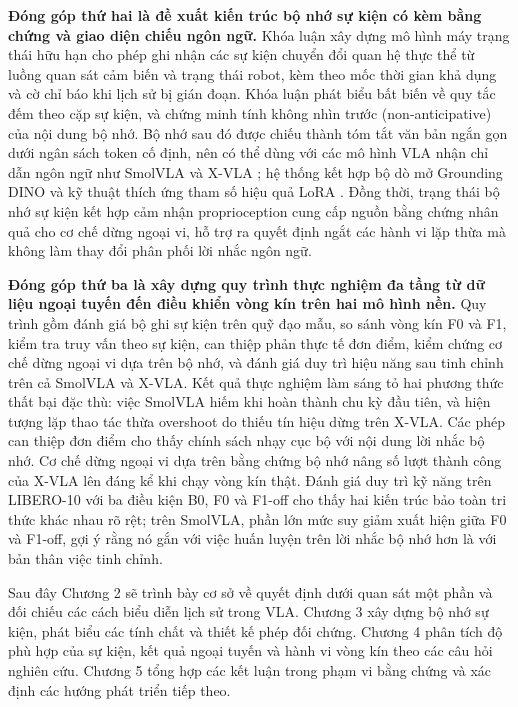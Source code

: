 \textbf{Đóng góp thứ hai là đề xuất kiến trúc bộ nhớ sự kiện có kèm bằng chứng và giao diện chiếu ngôn ngữ.} Khóa luận xây dựng mô hình máy trạng thái hữu hạn cho phép ghi nhận các sự kiện chuyển đổi quan hệ thực thể từ luồng quan sát cảm biến và trạng thái robot, kèm theo mốc thời gian khả dụng và cờ chỉ báo khi lịch sử bị gián đoạn. Khóa luận phát biểu bất biến về quy tắc đếm theo cặp sự kiện, và chứng minh tính không nhìn trước (non-anticipative) của nội dung bộ nhớ. Bộ nhớ sau đó được chiếu thành tóm tắt văn bản ngắn gọn dưới ngân sách token cố định, nên có thể dùng với các mô hình VLA nhận chỉ dẫn ngôn ngữ như SmolVLA \cite{smolvla2025} và X-VLA \cite{xvla2025}; hệ thống kết hợp bộ dò mở Grounding DINO \cite{groundingdino2024} và kỹ thuật thích ứng tham số hiệu quả LoRA \cite{lora2021}. Đồng thời, trạng thái bộ nhớ sự kiện kết hợp cảm nhận proprioception cung cấp nguồn bằng chứng nhân quả cho cơ chế dừng ngoại vi, hỗ trợ ra quyết định ngắt các hành vi lặp thừa mà không làm thay đổi phân phối lời nhắc ngôn ngữ.

\textbf{Đóng góp thứ ba là xây dựng quy trình thực nghiệm đa tầng từ dữ liệu ngoại tuyến đến điều khiển vòng kín trên hai mô hình nền.} Quy trình gồm đánh giá bộ ghi sự kiện trên quỹ đạo mẫu, so sánh vòng kín F0 và F1, kiểm tra truy vấn theo sự kiện, can thiệp phản thực tế đơn điểm, kiểm chứng cơ chế dừng ngoại vi dựa trên bộ nhớ, và đánh giá duy trì hiệu năng sau tinh chỉnh trên cả SmolVLA và X-VLA. Kết quả thực nghiệm làm sáng tỏ hai phương thức thất bại đặc thù: việc SmolVLA hiếm khi hoàn thành chu kỳ đầu tiên, và hiện tượng lặp thao tác thừa overshoot do thiếu tín hiệu dừng trên X-VLA. Các phép can thiệp đơn điểm cho thấy chính sách nhạy cục bộ với nội dung lời nhắc bộ nhớ. Cơ chế dừng ngoại vi dựa trên bằng chứng bộ nhớ nâng số lượt thành công của X-VLA lên đáng kể khi chạy vòng kín thật. Đánh giá duy trì kỹ năng trên LIBERO-10 với ba điều kiện B0, F0 và F1-off cho thấy hai kiến trúc bảo toàn tri thức khác nhau rõ rệt; trên SmolVLA, phần lớn mức suy giảm xuất hiện giữa F0 và F1-off, gợi ý rằng nó gắn với việc huấn luyện trên lời nhắc bộ nhớ hơn là với bản thân việc tinh chỉnh.

Sau đây Chương 2 sẽ trình bày cơ sở về quyết định dưới quan sát một phần và đối chiếu các cách biểu diễn lịch sử trong VLA. Chương 3 xây dựng bộ nhớ sự kiện, phát biểu các tính chất và thiết kế phép đối chứng. Chương 4 phân tích độ phù hợp của sự kiện, kết quả ngoại tuyến và hành vi vòng kín theo các câu hỏi nghiên cứu. Chương 5 tổng hợp các kết luận trong phạm vi bằng chứng và xác định các hướng phát triển tiếp theo.
